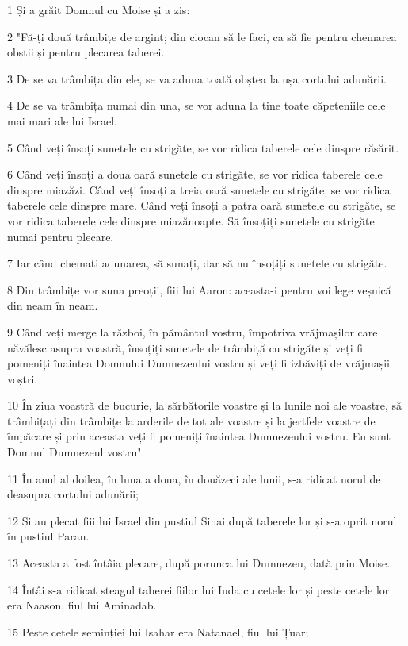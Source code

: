 \par 1 Și a grăit Domnul cu Moise și a zis:
\par 2 "Fă-ți două trâmbițe de argint; din ciocan să le faci, ca să fie pentru chemarea obștii și pentru plecarea taberei.
\par 3 De se va trâmbița din ele, se va aduna toată obștea la ușa cortului adunării.
\par 4 De se va trâmbița numai din una, se vor aduna la tine toate căpeteniile cele mai mari ale lui Israel.
\par 5 Când veți însoți sunetele cu strigăte, se vor ridica taberele cele dinspre răsărit.
\par 6 Când veți însoți a doua oară sunetele cu strigăte, se vor ridica taberele cele dinspre miazăzi. Când veți însoți a treia oară sunetele cu strigăte, se vor ridica taberele cele dinspre mare. Când veți însoți a patra oară sunetele cu strigăte, se vor ridica taberele cele dinspre miazănoapte. Să însoțiți sunetele cu strigăte numai pentru plecare.
\par 7 Iar când chemați adunarea, să sunați, dar să nu însoțiți sunetele cu strigăte.
\par 8 Din trâmbițe vor suna preoții, fiii lui Aaron: aceasta-i pentru voi lege veșnică din neam în neam.
\par 9 Când veți merge la război, în pământul vostru, împotriva vrăjmașilor care năvălesc asupra voastră, însoțiți sunetele de trâmbiță cu strigăte și veți fi pomeniți înaintea Domnului Dumnezeului vostru și veți fi izbăviți de vrăjmașii voștri.
\par 10 În ziua voastră de bucurie, la sărbătorile voastre și la lunile noi ale voastre, să trâmbițați din trâmbițe la arderile de tot ale voastre și la jertfele voastre de împăcare și prin aceasta veți fi pomeniți înaintea Dumnezeului vostru. Eu sunt Domnul Dumnezeul vostru".
\par 11 În anul al doilea, în luna a doua, în douăzeci ale lunii, s-a ridicat norul de deasupra cortului adunării;
\par 12 Și au plecat fiii lui Israel din pustiul Sinai după taberele lor și s-a oprit norul în pustiul Paran.
\par 13 Aceasta a fost întâia plecare, după porunca lui Dumnezeu, dată prin Moise.
\par 14 Întâi s-a ridicat steagul taberei fiilor lui Iuda cu cetele lor și peste cetele lor era Naason, fiul lui Aminadab.
\par 15 Peste cetele seminției lui Isahar era Natanael, fiul lui Țuar;
